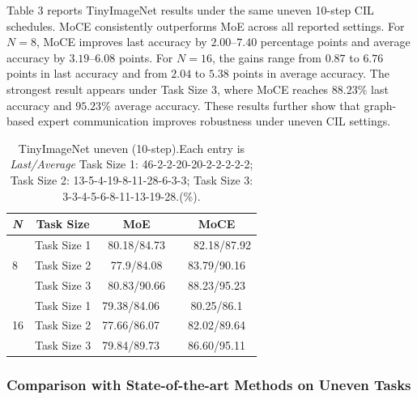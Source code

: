 \documentclass{article}
\theoremstyle{definition}
\theoremstyle{remark}
\begin{document}
Table 3 reports TinyImageNet results under the same uneven 10-step CIL schedules. MoCE consistently outperforms MoE across all reported settings. For $N=8$, MoCE improves last accuracy by $2.00$--$7.40$ percentage points and average accuracy by $3.19$--$6.08$ points. For $N=16$, the gains range from $0.87$ to $6.76$ points in last accuracy and from $2.04$ to $5.38$ points in average accuracy. The strongest result appears under Task Size 3, where MoCE reaches $88.23\%$ last accuracy and $95.23\%$ average accuracy. These results further show that graph-based expert communication improves robustness under uneven CIL settings.
\begin{table}[H]
\centering
\scriptsize
\setlength{\tabcolsep}{10pt}

\label{tab:tinyimagenet_uneven_n8_ieee}
\begin{tabular}{lccc}
\toprule
\textit{\textbf{N}} & Task Size & MoE & MoCE \\
\midrule
 & Task Size 1 & 80.18/84.73 &  82.18/87.92\\
8& Task Size 2 & 77.9/84.08 & 83.79/90.16\\
 & Task Size 3 & 80.83/90.66 & 88.23/95.23\\
\bottomrule

 & Task Size 1 & 79.38/84.06  & 80.25/86.1\\
16& Task Size 2 & 77.66/86.07  & 82.02/89.64 \\
 & Task Size 3 & 79.84/89.73  & 86.60/95.11 \\
\bottomrule
\end{tabular}
\vspace{1mm}

\caption{TinyImageNet uneven (10-step).Each entry is \textit{Last/Average}
Task Size 1: 46-2-2-20-20-2-2-2-2-2; 
Task Size 2: 13-5-4-19-8-11-28-6-3-3; 
Task Size 3: 3-3-4-5-6-8-11-13-19-28.(\%).}
\footnotesize

\end{table}

\subsubsection{Comparison with State-of-the-art Methods on Uneven Tasks}
\end{document}
